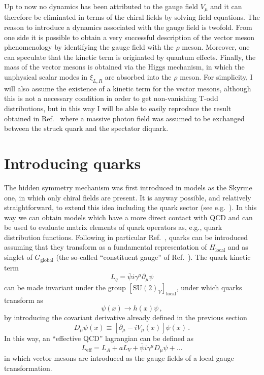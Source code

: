 \documentclass[]{revtex4}
\def\be{\begin{equation}}
\def\ee{\end{equation}}
\begin{document}
Up to now no dynamics has been attributed to the gauge field
$V_\mu$ and it can therefore be eliminated in terms of the chiral fields
by solving field equations. The reason to introduce a dynamics
associated with the gauge field is twofold. From one side it is 
possible to obtain a very successful description of the vector meson
phenomenology by identifying the gauge field with the $\rho$ meson. Moreover,
one can speculate that the kinetic term is originated by quantum
effects. 
Finally, the mass of the vector mesons is obtained via 
the Higgs mechanism, in which the unphysical scalar modes
in $\xi_{L,R}$ are absorbed into the $\rho$ meson.
For simplicity, I will also assume the existence of a kinetic term
for the vector mesons, although this is not a necessary condition
in order to get non-vanishing T-odd distributions, but in this 
way I will be able to easily reproduce the result obtained in
Ref.~\cite{Brodsky:2002cx} where a massive photon field
was assumed to be exchanged between the struck quark and the
spectator diquark. 


\section{Introducing quarks}

The hidden symmetry mechanism was first introduced in 
models as the Skyrme one, in which only chiral fields
are present. It is anyway possible, and relatively
straightforward, to extend this idea including the 
quark sector 
(see e.g.~\cite{Bando:1984pw,Simic:1985jx,Meissner:1987ge,RuizArriola:1990am}).
In this way we can obtain models which have a more direct
contact with QCD and can be used to evaluate matrix
elements of quark operators as, e.g., quark distribution functions.
Following in particular Ref.~\cite{Bando:1984pw}, quarks can
be introduced assuming that they transform as a fundamental
representation of $H_\mathrm{local}$ and as singlet of 
$G_\mathrm{global}$ (the so-called
``constituent gauge'' of Ref.~\cite{Simic:1985jx}).
The quark kinetic term 
\be
L_q=\bar\psi i \gamma^\mu\partial_\mu\psi
\ee
can be made invariant under the group
$[\mathrm{SU(2)}_V]_\mathrm{local}$,
under which quarks transform as
\be
\psi(x)\rightarrow h(x) \psi\, ,
\ee
by introducing the covariant derivative already defined
in the previous section 
\be
D_\mu\psi(x)\equiv[\partial_\mu-iV_\mu(x)]\psi(x)\, .
\ee
In this way, an ``effective QCD'' lagrangian
can be defined as
\be
L_\mathrm{eff}=L_A+a L_V+\bar\psi i \gamma^\mu D_\mu\psi +...
\ee
in which vector mesons are introduced as the gauge fields
of a local gauge transformation. 
\end{document}
